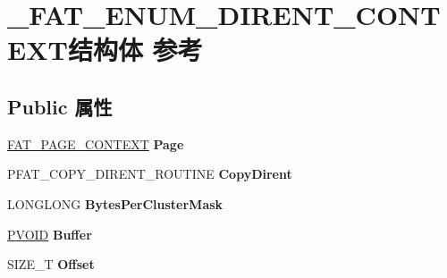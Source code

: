 \hypertarget{struct___f_a_t___e_n_u_m___d_i_r_e_n_t___c_o_n_t_e_x_t}{}\section{\+\_\+\+F\+A\+T\+\_\+\+E\+N\+U\+M\+\_\+\+D\+I\+R\+E\+N\+T\+\_\+\+C\+O\+N\+T\+E\+X\+T结构体 参考}
\label{struct___f_a_t___e_n_u_m___d_i_r_e_n_t___c_o_n_t_e_x_t}
\subsection*{Public 属性}
\begin{DoxyCompactItemize}
\item 
\mbox{\label{struct___f_a_t___e_n_u_m___d_i_r_e_n_t___c_o_n_t_e_x_t_a8ab8acaf9c3eb25cdf87ae6487351be2}} 
\hyperlink{struct___f_a_t___p_a_g_e___c_o_n_t_e_x_t}{F\+A\+T\+\_\+\+P\+A\+G\+E\+\_\+\+C\+O\+N\+T\+E\+XT} {\bfseries Page}
\item 
\mbox{\label{struct___f_a_t___e_n_u_m___d_i_r_e_n_t___c_o_n_t_e_x_t_a298370d284a46715971b0fde2d6ea9fd}} 
P\+F\+A\+T\+\_\+\+C\+O\+P\+Y\+\_\+\+D\+I\+R\+E\+N\+T\+\_\+\+R\+O\+U\+T\+I\+NE {\bfseries Copy\+Dirent}
\item 
\mbox{\label{struct___f_a_t___e_n_u_m___d_i_r_e_n_t___c_o_n_t_e_x_t_a9642041127b355b5a86aabd1897b47bd}} 
L\+O\+N\+G\+L\+O\+NG {\bfseries Bytes\+Per\+Cluster\+Mask}
\item 
\mbox{\label{struct___f_a_t___e_n_u_m___d_i_r_e_n_t___c_o_n_t_e_x_t_a8b59f1bedf15b0ba447890878ae07d9e}} 
\hyperlink{interfacevoid}{P\+V\+O\+ID} {\bfseries Buffer}
\item 
\mbox{\label{struct___f_a_t___e_n_u_m___d_i_r_e_n_t___c_o_n_t_e_x_t_a31c76ddfdc106b95f2c77341d2f54635}} 
S\+I\+Z\+E\+\_\+T {\bfseries Offset}
\item 
\mbox{\label{struct___f_a_t___e_n_u_m___d_i_r_e_n_t___c_o_n_t_e_x_t_a5bfb195b3237d1e130ecc8551a789c18}} 

\end{DoxyCompactItemize}

